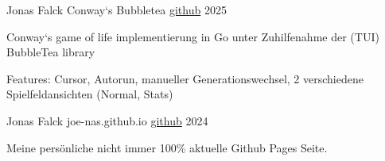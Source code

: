 

\begin{cventries}

\cventry
    {Jonas Falck} %
    {Conway`s Bubbletea} %
    {\href{https://github.com/joe-nas/conways_bubbletea}{github}} %
    {2025} %
    {
      \begin{cvitems} %
        \item {Conway`s game of life implementierung in Go unter Zuhilfenahme der (TUI) BubbleTea library}
        \item {Features: Cursor, Autorun, manueller Generationswechsel, 2 verschiedene Spielfeldansichten (Normal, Stats)}
        \vspace{0.2cm}
        \newline{}  
      \end{cvitems}
    }

    \cventry
    {Jonas Falck} %
    {joe-nas.github.io} %
    {\href{https://github.com/joe-nas/joe-nas.github.io}{github}} %
    {2024} %
    {
      \begin{cvitems} %
        \item {Meine persönliche nicht immer 100\% aktuelle Github Pages Seite.}
        \vspace{0.2cm}
        \newline{} 
      \end{cvitems}
    }


\end{cventries}
